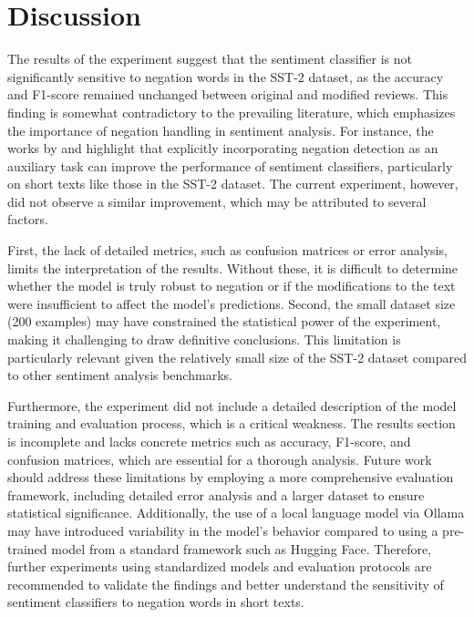 \documentclass{article}
\begin{document}
\section{Discussion}
The results of the experiment suggest that the sentiment classifier is not significantly sensitive to negation words in the SST-2 dataset, as the accuracy and F1-score remained unchanged between original and modified reviews. This finding is somewhat contradictory to the prevailing literature, which emphasizes the importance of negation handling in sentiment analysis. For instance, the works by \cite{DBLP:journals/corr/abs-1906-07610} and \cite{DBLP:journals/corr/abs-1906-07599} highlight that explicitly incorporating negation detection as an auxiliary task can improve the performance of sentiment classifiers, particularly on short texts like those in the SST-2 dataset. The current experiment, however, did not observe a similar improvement, which may be attributed to several factors.

First, the lack of detailed metrics, such as confusion matrices or error analysis, limits the interpretation of the results. Without these, it is difficult to determine whether the model is truly robust to negation or if the modifications to the text were insufficient to affect the model's predictions. Second, the small dataset size (200 examples) may have constrained the statistical power of the experiment, making it challenging to draw definitive conclusions. This limitation is particularly relevant given the relatively small size of the SST-2 dataset compared to other sentiment analysis benchmarks.

Furthermore, the experiment did not include a detailed description of the model training and evaluation process, which is a critical weakness. The results section is incomplete and lacks concrete metrics such as accuracy, F1-score, and confusion matrices, which are essential for a thorough analysis. Future work should address these limitations by employing a more comprehensive evaluation framework, including detailed error analysis and a larger dataset to ensure statistical significance. Additionally, the use of a local language model via Ollama may have introduced variability in the model's behavior compared to using a pre-trained model from a standard framework such as Hugging Face. Therefore, further experiments using standardized models and evaluation protocols are recommended to validate the findings and better understand the sensitivity of sentiment classifiers to negation words in short texts.
\end{document}
